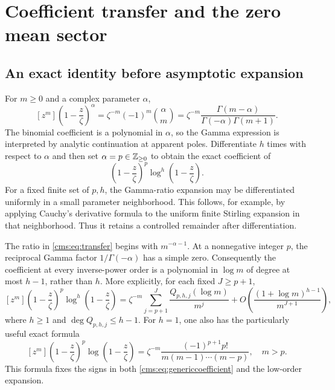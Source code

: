 \section{Coefficient transfer and the zero mean sector}\label{cms:sec:transfer}
\subsection{An exact identity before asymptotic expansion}
For $m\geq0$ and a complex parameter $\alpha$,
\begin{equation}\label{cms:eq:transfer}
[z^m]\left(1-\frac z\zeta\right)^\alpha
=\zeta^{-m}(-1)^m\binom\alpha m
=\zeta^{-m}\frac{\Gamma(m-\alpha)}
 {\Gamma(-\alpha)\Gamma(m+1)}.
\end{equation}
The binomial coefficient is a polynomial in $\alpha$, so the Gamma expression is interpreted by analytic continuation at apparent poles. Differentiate $h$ times with respect to $\alpha$ and then set $\alpha=p\in\mathbb Z_{\geq0}$ to obtain the exact coefficient of
\[
\left(1-\frac z\zeta\right)^p\log^h\left(1-\frac z\zeta\right).
\]
For a fixed finite set of $p,h$, the Gamma-ratio expansion may be differentiated uniformly in a small parameter neighborhood. This follows, for example, by applying Cauchy's derivative formula to the uniform finite Stirling expansion in that neighborhood. Thus it retains a controlled remainder after differentiation.

The ratio in \eqref{cms:eq:transfer} begins with $m^{-\alpha-1}$. At a nonnegative integer $p$, the reciprocal Gamma factor $1/\Gamma(-\alpha)$ has a simple zero. Consequently the coefficient at every inverse-power order is a polynomial in $\log m$ of degree at most $h-1$, rather than $h$. More explicitly, for each fixed $J\geq p+1$,
\begin{equation}\label{cms:eq:generaltransfer}
[z^m]\left(1-\frac z\zeta\right)^p\log^h\left(1-\frac z\zeta\right)
=\zeta^{-m}\sum_{j=p+1}^{J}\frac{Q_{p,h,j}(\log m)}{m^j}
+O\!\left(\frac{(1+\log m)^{h-1}}{m^{J+1}}\right),
\end{equation}
where $h\geq1$ and $\deg Q_{p,h,j}\leq h-1$. For $h=1$, one also has the particularly useful exact formula
\begin{equation}\label{cms:eq:singlelog}
[z^m]\left(1-\frac z\zeta\right)^p\log\left(1-\frac z\zeta\right)
=\zeta^{-m}\frac{(-1)^{p+1}p!}{m(m-1)\cdots(m-p)},\quad m>p.
\end{equation}
This formula fixes the signs in both \eqref{cms:eq:genericcoefficient} and the low-order expansion.

